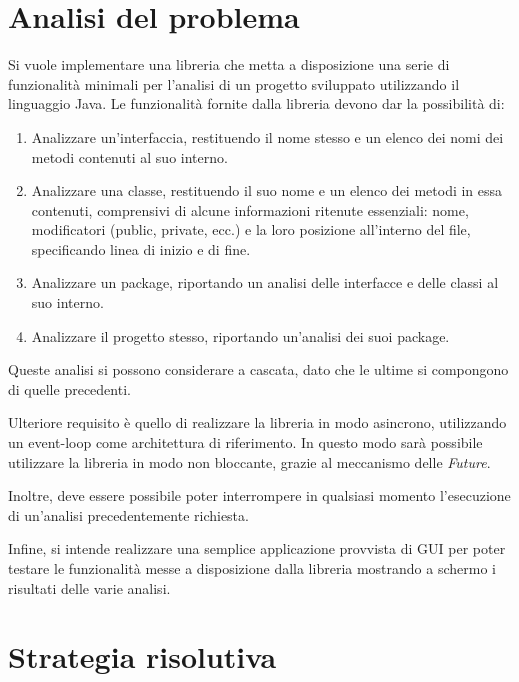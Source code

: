 \section{Analisi del problema}

Si vuole implementare una libreria che metta a disposizione una serie di funzionalità minimali per l'analisi di un progetto sviluppato utilizzando il linguaggio Java.
%
Le funzionalità fornite dalla libreria devono dar la possibilità di:

\begin{enumerate}
    \item Analizzare un'interfaccia, restituendo il nome stesso e un elenco dei nomi dei metodi contenuti al suo interno.
    
    \item Analizzare una classe, restituendo il suo nome e un elenco dei metodi in essa contenuti, comprensivi di alcune informazioni ritenute essenziali: nome, modificatori (public, private, ecc.) e la loro posizione all'interno del file, specificando linea di inizio e di fine.
    
    \item Analizzare un package, riportando un analisi delle interfacce e delle classi al suo interno.
    
    \item Analizzare il progetto stesso, riportando un'analisi dei suoi package.
\end{enumerate}

Queste analisi si possono considerare a cascata, dato che le ultime si compongono di quelle precedenti.

Ulteriore requisito è quello di realizzare la libreria in modo asincrono, utilizzando un event-loop come architettura di riferimento.
%
In questo modo sarà possibile utilizzare la libreria in modo non bloccante, grazie al meccanismo delle \textit{Future}.

Inoltre, deve essere possibile poter interrompere in qualsiasi momento l'esecuzione di un'analisi precedentemente richiesta.

Infine, si intende realizzare una semplice applicazione provvista di GUI per poter testare le funzionalità messe a disposizione dalla libreria mostrando a schermo i risultati delle varie analisi.

\section{Strategia risolutiva}

